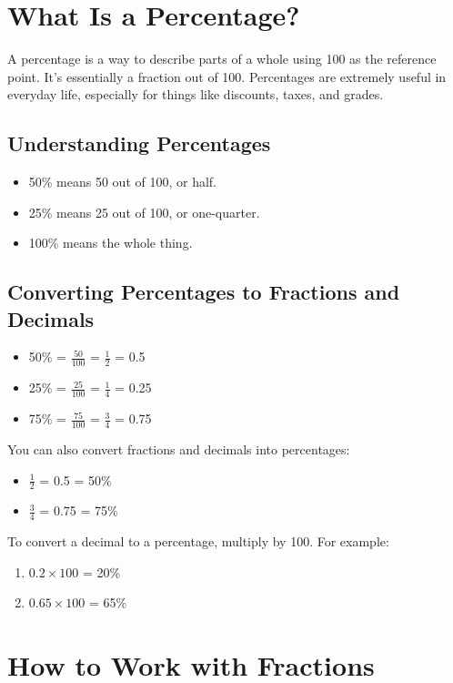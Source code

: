 \section{What Is a Percentage?}
A percentage is a way to describe parts of a whole using 100 as the reference point. It’s essentially a fraction out of 100. Percentages are extremely useful in everyday life, especially for things like discounts, taxes, and grades.

\subsection{Understanding Percentages}
\begin{itemize}
    \item 50\% means 50 out of 100, or half.
    \item 25\% means 25 out of 100, or one-quarter.
    \item 100\% means the whole thing.
\end{itemize}

\subsection{Converting Percentages to Fractions and Decimals}
\begin{itemize}
    \item 50\% = $\frac{50}{100}$ = $\frac{1}{2}$ = 0.5
    \item 25\% = $\frac{25}{100}$ = $\frac{1}{4}$ = 0.25
    \item 75\% = $\frac{75}{100}$ = $\frac{3}{4}$ = 0.75
\end{itemize}

You can also convert fractions and decimals into percentages:
\begin{itemize}
    \item $\frac{1}{2}$ = 0.5 = 50\%
    \item $\frac{3}{4}$ = 0.75 = 75\%
\end{itemize}

To convert a decimal to a percentage, multiply by 100. For example:
\begin{enumerate}
    \item $0.2 \times 100$ = 20\%
    \item $0.65 \times 100$ = 65\% 
\end{enumerate}

\section{How to Work with Fractions}
